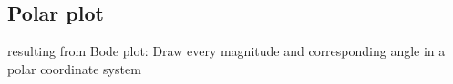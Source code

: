 \subsection{Polar plot}
    resulting from Bode plot: Draw every magnitude and corresponding angle in a polar coordinate system